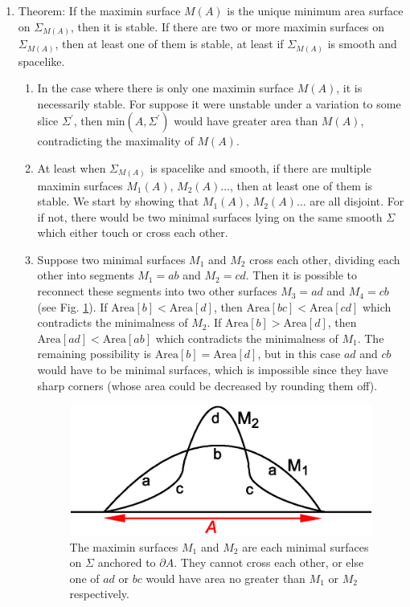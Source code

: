 \documentclass{article}
\begin{document}
\begin{enumerate}[resume]
\item \label{sta} Theorem: If the maximin surface $M(A)$ is the unique minimum area surface on $\Sigma_{M(A)}$, then it is stable. If there are two or more maximin surfaces on $\Sigma_{M(A)}$, then at least one of them is stable, at least if $\Sigma_{M(A)}$ is smooth and spacelike.
	\begin{enumerate}
	\item In the case where there is only one maximin surface $M(A)$, it is necessarily stable.  For suppose it were unstable under a variation to some slice $\Sigma^\prime$, then $\mathrm{min}(A,\Sigma^\prime)$ would have greater area than $M(A)$, contradicting the maximality of $M(A)$.
	\item At least when $\Sigma_{M(A)}$ is spacelike and smooth, if there are multiple maximin surfaces $M_1(A),\,M_2(A)\ldots$, then at least one of them is stable.  We start by showing that $M_1(A),\,M_2(A)\ldots$ are all disjoint.  For if not, there would be two minimal surfaces lying on the same smooth $\Sigma$ which either touch or cross each other.  
	\item Suppose two minimal surfaces $M_1$ and $M_2$ cross each other, dividing each other into segments $M_1 = ab$ and $M_2 = cd$.  Then it is possible to reconnect these segments into two other surfaces $M_3 = ad$ and $M_4 = cb$ (see Fig. \ref{squiggle}).  If $\mathrm{Area}[b] < \mathrm{Area}[d]$, then $\mathrm{Area}[bc] < \mathrm{Area}[cd]$ which contradicts the minimalness of $M_2$.  If $\mathrm{Area}[b] > \mathrm{Area}[d]$, then $\mathrm{Area}[ad] < \mathrm{Area}[ab]$ which contradicts the minimalness of $M_1$.  The remaining possibility is $\mathrm{Area}[b] = \mathrm{Area}[d]$, but in this case $ad$ and $cb$ would have to be minimal surfaces, which is impossible since they have sharp corners (whose area could be decreased by rounding them off).
\begin{figure}[hbt]
\centering
\includegraphics[width=.5\textwidth]{squiggle.eps}
\caption{\footnotesize The maximin surfaces $M_1$ and $M_2$ are each minimal surfaces on $\Sigma$ anchored to $\partial A$.  They cannot cross each other, or else one of $ad$ or $bc$ would have area no greater than $M_1$ or $M_2$ respectively.}\label{squiggle}

\end{figure}
\end{enumerate}
\end{enumerate}
\end{document}
